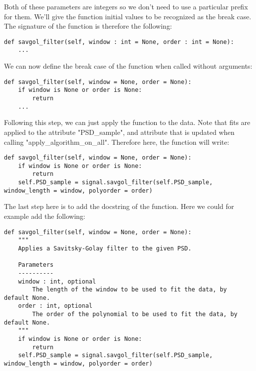 Both of these parameters are integers so we don't need to use a particular prefix for them. We'll give the function initial values to be recognized as the break case. The signature of the function is therefore the following:

\begin{lstlisting}
def savgol_filter(self, window : int = None, order : int = None):
    ...
\end{lstlisting}

We can now define the break case of the function when called without arguments:
\begin{lstlisting}
def savgol_filter(self, window = None, order = None):
    if window is None or order is None:
        return
    ...
\end{lstlisting}

Following this step, we can just apply the function to the data. Note that fits are applied to the attribute "PSD\_sample", and attribute that is updated when calling "apply\_algorithm\_on\_all". Therefore here, the function will write:

\begin{lstlisting}
def savgol_filter(self, window = None, order = None):
    if window is None or order is None:
        return
    self.PSD_sample = signal.savgol_filter(self.PSD_sample, window_length = window, polyorder = order)
\end{lstlisting}
 
The last step here is to add the docstring of the function. Here we could for example add the following:
\begin{lstlisting}
def savgol_filter(self, window = None, order = None):
    """
    Applies a Savitsky-Golay filter to the given PSD.

    Parameters
    ----------
    window : int, optional
        The length of the window to be used to fit the data, by default None.
    order : int, optional
        The order of the polynomial to be used to fit the data, by default None.
    """
    if window is None or order is None:
        return
    self.PSD_sample = signal.savgol_filter(self.PSD_sample, window_length = window, polyorder = order)
\end{lstlisting}
